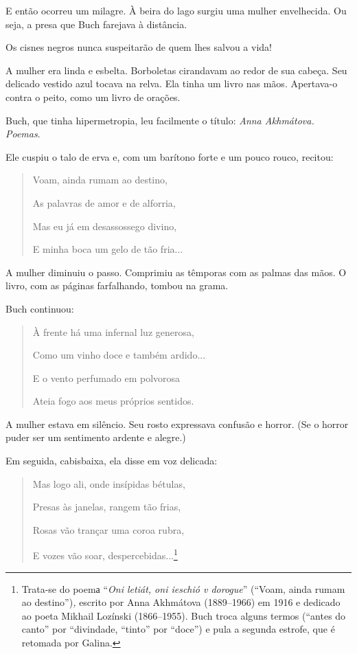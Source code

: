 E então ocorreu um milagre. À beira do lago surgiu uma mulher
envelhecida. Ou seja, a presa que Buch farejava à distância.

Os cisnes negros nunca suspeitarão de quem lhes salvou a vida!

A mulher era linda e esbelta. Borboletas cirandavam ao redor de sua
cabeça. Seu delicado vestido azul tocava na relva. Ela tinha um livro
nas mãos. Apertava-o contra o peito, como um livro de orações.

Buch, que tinha hipermetropia, leu facilmente o título: \emph{Anna
Akhmátova. Poemas}.

Ele cuspiu o talo de erva e, com um barítono forte e um pouco rouco,
recitou:

\begin{quote}
Voam, ainda rumam ao destino,

As palavras de amor e de alforria,

Mas eu já em desassossego divino,

E minha boca um gelo de tão fria...
\end{quote}

A mulher diminuiu o passo. Comprimiu as têmporas com as palmas das mãos.
O livro, com as páginas farfalhando, tombou na grama.

Buch continuou:

\begin{quote}
À frente há uma infernal luz generosa,

Como um vinho doce e também ardido...

E o vento perfumado em polvorosa

Ateia fogo aos meus próprios sentidos.
\end{quote}

A mulher estava em silêncio. Seu rosto expressava confusão e horror. (Se
o horror puder ser um sentimento ardente e alegre.)

Em seguida, cabisbaixa, ela disse em voz delicada:

\begin{quote}
Mas logo ali, onde insípidas bétulas,

Presas às janelas, rangem tão frias,

Rosas vão trançar uma coroa rubra,

E vozes vão soar, despercebidas...\footnote{Trata-se do poemа
  ``\emph{Oni letiát, oni ieschió v dorogue}'' (``Voam, ainda rumam ao
  destino'')\emph{,} escrito por Anna Akhmátova (1889--1966) em 1916 e
  dedicado ao poeta Mikhail Lozínski (1866--1955). Buch troca alguns
  termos (``antes do canto'' por ``divindade, ``tinto'' por ``doce'') e
  pula a segunda estrofe, que é retomada por Galina.}
\end{quote}

